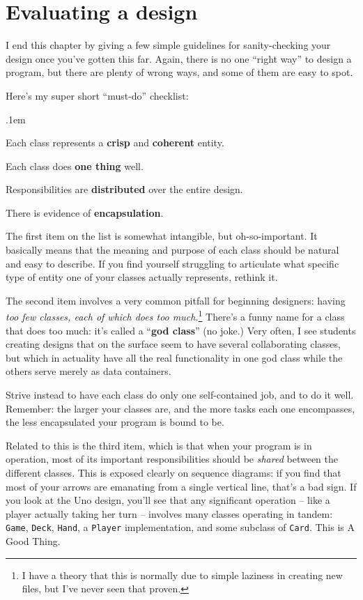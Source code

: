 \section{Evaluating a design}

I end this chapter by giving a few simple guidelines for sanity-checking your
design once you've gotten this far. Again, there is no one ``right way'' to
design a program, but there are plenty of wrong ways, and some of them are easy
to spot.

Here's my super short ``must-do'' checklist:

\begin{compactenum}
\itemsep.1em
\item Each class represents a \textbf{crisp} and \textbf{coherent} entity.
\item Each class does \textbf{one thing} well.
\item Responsibilities are \textbf{distributed} over the entire design.
\item There is evidence of \textbf{encapsulation}.
\end{compactenum}

The first item on the list is somewhat intangible, but oh-so-important. It
basically means that the meaning and purpose of each class should be natural
and easy to describe. If you find yourself struggling to articulate what
specific type of entity one of your classes actually represents, rethink it.

The second item involves a very common pitfall for beginning designers: having
\textit{too few classes, each of which does too much.}\footnote{I have a theory
that this is normally due to simple laziness in creating new files, but I've
never seen that proven.} There's a funny name for a class that does too much:
it's called a ``\textbf{god class}'' (no joke.) Very often, I see students
creating designs that on the surface seem to have several collaborating
classes, but which in actuality have all the real functionality in one god
class while the others serve merely as data containers.

Strive instead to have each class do only one self-contained job, and to do it
well. Remember: the larger your classes are, and the more tasks each one
encompasses, the less encapsulated your program is bound to be.

Related to this is the third item, which is that when your program is in
operation, most of its important responsibilities should be \textit{shared}
between the different classes. This is exposed clearly on sequence diagrams:
if you find that most of your arrows are emanating from a single vertical line,
that's a bad sign. If you look at the Uno design, you'll see that any
significant operation -- like a player actually taking her turn -- involves
many classes operating in tandem: \texttt{Game}, \texttt{Deck}, \texttt{Hand},
a \texttt{Player} implementation, and some subclass of \texttt{Card}. This is A
Good Thing.\texttrademark

